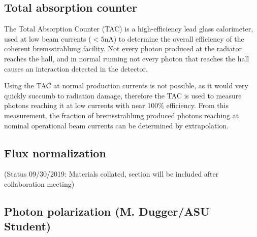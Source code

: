 %
%
%
%


\subsection{Total absorption counter \label{sec:tac}}
The Total Absorption Counter (TAC) is a high-efficiency lead glass calorimeter, used at low beam currents ($<5$nA) to determine the overall efficiency of the coherent bremsstrahlung facility.
Not every photon produced at the radiator reaches the hall, and in normal \GX{} running not every photon that reaches the hall causes an interaction detected in the \GX{} detector.

Using the TAC at normal \GX{} production currents is not possible, as it would very quickly succumb to radiation damage, therefore the TAC is used to measure photons reaching it at low currents with near 100\% efficiency.
From this measurement, the fraction of bremsstrahlung produced photons reaching \GX{} at nominal operational beam currents can be determined by extrapolation.

\subsection{Flux normalization \label{sec:fluxnorm}}
(Status 09/30/2019: Materials collated, section will be included after collaboration meeting)

\subsection{Photon polarization (M. Dugger/ASU Student)\label{sec:polarization}}